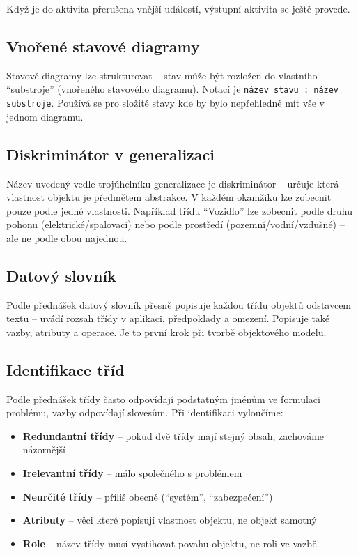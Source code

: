 \documentclass[12pt, a4paper]{article}
\begin{document}
Když je do-aktivita přerušena vnější událostí, výstupní aktivita se ještě provede.

\subsection{Vnořené stavové diagramy}

Stavové diagramy lze strukturovat -- stav může být rozložen do vlastního ``substroje'' (vnořeného stavového diagramu). Notací je \texttt{název stavu : název substroje}. Používá se pro složité stavy kde by bylo nepřehledné mít vše v jednom diagramu.

\subsection{Diskriminátor v generalizaci}

Název uvedený vedle trojúhelníku generalizace je diskriminátor -- určuje která vlastnost objektu je předmětem abstrakce. V každém okamžiku lze zobecnit pouze podle jedné vlastnosti. Například třídu ``Vozidlo'' lze zobecnit podle druhu pohonu (elektrické/spalovací) nebo podle prostředí (pozemní/vodní/vzdušné) -- ale ne podle obou najednou.

\subsection{Datový slovník}

Podle přednášek datový slovník přesně popisuje každou třídu objektů odstavcem textu -- uvádí rozsah třídy v aplikaci, předpoklady a omezení. Popisuje také vazby, atributy a operace. Je to první krok při tvorbě objektového modelu.

\subsection{Identifikace tříd}

Podle přednášek třídy často odpovídají podstatným jménům ve formulaci problému, vazby odpovídají slovesům. Při identifikaci vyloučíme:
\begin{itemize}
  \item \textbf{Redundantní třídy} -- pokud dvě třídy mají stejný obsah, zachováme názornější
  \item \textbf{Irelevantní třídy} -- málo společného s problémem
  \item \textbf{Neurčité třídy} -- příliš obecné (``systém'', ``zabezpečení'')
  \item \textbf{Atributy} -- věci které popisují vlastnost objektu, ne objekt samotný
  \item \textbf{Role} -- název třídy musí vystihovat povahu objektu, ne roli ve vazbě
\end{itemize}
\end{document}
